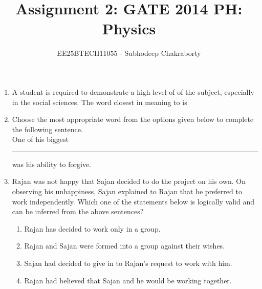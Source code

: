 \documentclass[journal,12pt,onecolumn]{IEEEtran}
\theoremstyle{remark}
\begin{document}

\vspace{3cm}

\title{Assignment 2: GATE 2014 PH: Physics}
\author{EE25BTECH11055 - Subhodeep Chakraborty}
\maketitle
\hrulefill
\bigskip

\renewcommand{\thefigure}{\theenumi}
\renewcommand{\thetable}{\theenumi}

\begin{enumerate}
\item A student is required to demonstrate a high level of \underline{} of the subject, especially in the social sciences. The word closest in meaning to \underline{} is
\hfill{} \begin{enumerate}  \end{enumerate}

\item Choose the most appropriate word from the options given below to complete the following sentence. \\
One of his biggest \rule{1.5cm}{0.025pt} was his ability to forgive.
\hfill{} \begin{enumerate}  \end{enumerate}

\item Rajan was not happy that Sajan decided to do the project on his own. On observing his unhappiness, Sajan explained to Rajan that he preferred to work independently. Which one of the statements below is logically valid and can be inferred from the above sentences?
\hfill{} \begin{enumerate}
    \item Rajan has decided to work only in a group.
    \item Rajan and Sajan were formed into a group against their wishes.
    \item Sajan had decided to give in to Rajan's request to work with him.
    \item Rajan had believed that Sajan and he would be working together.
\end{enumerate}


\end{enumerate}
\end{document}

